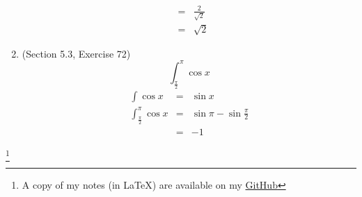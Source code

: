 \documentclass{article}
\newcommand\blfootnote[1]{
    \begingroup
    \renewcommand\thefootnote{}\footnote{#1}
    \addtocounter{footnote}{-1}
    \endgroup
}
\begin{document}
\begin{enumerate}
\begin{eqnarray}
                                                            &=& \frac{2}{\sqrt{2}} \\
                                                            &=& \sqrt{2}
        \end{eqnarray}
    \item (Section 5.3, Exercise 72)
        $$\int_{\frac{\pi}{2}}^{\pi}{\cos{x}}$$
        \begin{eqnarray}
            \int{\cos{x}} &=& \sin{x} \\
            \int_{\frac{\pi}{2}}^{\pi}{\cos{x}} &=& \sin{\pi} - \sin{\frac{\pi}{2}} \\
                                                &=& -1
        \end{eqnarray}
\end{enumerate}

\blfootnote{A copy of my notes (in \LaTeX) are available on my \href{https://github.com/onlinechronically/MATH-211}{GitHub}}
\end{document}
